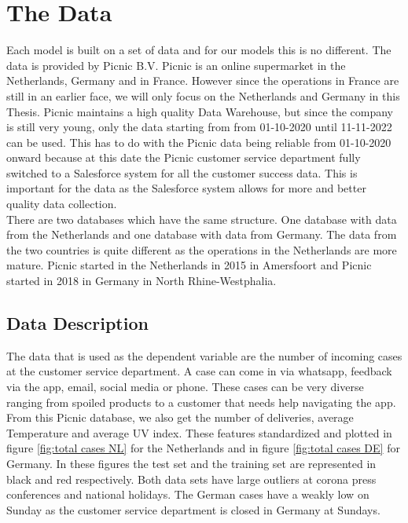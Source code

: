 \section{The Data}
\label{seq:the data}
Each model is built on a set of data and for our models this is no different. The data is provided by Picnic B.V. Picnic is an online supermarket in the Netherlands, Germany and in France. However since the operations in France are still in an earlier face, we will only focus on the Netherlands and Germany in this Thesis. Picnic maintains a high quality Data Warehouse, but since the company is still very young, only the data starting from  from 01-10-2020 until 11-11-2022 can be used. This has to do with the Picnic data being reliable from 01-10-2020 onward because at this date the Picnic customer service department fully switched to a Salesforce system for all the customer success data. This is important for the data as the Salesforce system allows for more and better quality data collection.\\

There are two databases which have the same structure. One database with data from the Netherlands and one database with data from Germany. The data from the two countries is quite different as the operations in the Netherlands are more mature. Picnic started in the Netherlands in 2015 in Amersfoort and Picnic started in 2018 in Germany in North Rhine-Westphalia.

\subsection{Data Description}
The data that is used as the dependent variable are the number of incoming cases at the customer service department. A case can come in via whatsapp, feedback via the app, email, social media or phone. These cases can be very diverse ranging from spoiled products to a customer that needs help navigating the app. From this Picnic database, we also get the number of deliveries, average Temperature and average UV index. These features standardized and plotted in figure \ref{fig:total cases NL} for the Netherlands and in figure \ref{fig:total cases DE} for Germany. In these figures the test set and the training set are represented in black and red respectively. Both data sets have large outliers at corona press conferences and national holidays. The German cases have a weakly low on Sunday as the customer service department is closed in Germany at Sundays.\\

